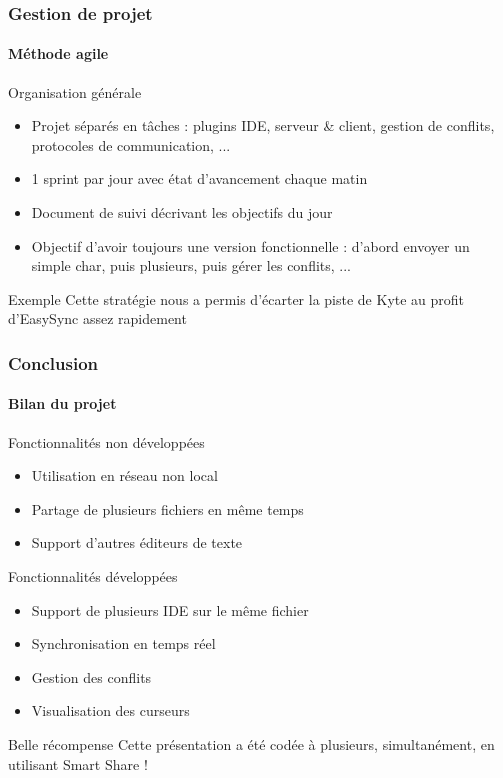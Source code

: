 \documentclass{beamer}
\begin{document}
\begin{frame}
    \frametitle{Gestion de projet}
    \framesubtitle{Méthode agile}
    \begin{block}{Organisation générale}
        \begin{itemize}
            \item Projet séparés en tâches : plugins IDE, serveur \& client, gestion de conflits, protocoles de communication, ...
            \item 1 sprint par jour avec état d'avancement chaque matin
            \item Document de suivi décrivant les objectifs du jour
            \item Objectif d'avoir toujours une version fonctionnelle : d'abord envoyer un simple char, puis plusieurs, puis gérer les conflits, ...
        \end{itemize}
    \end{block}
    \pause
    \begin{exampleblock}{Exemple}
        Cette stratégie nous a permis d'écarter la piste de Kyte au profit d'EasySync assez rapidement
    \end{exampleblock}
\end{frame}

\begin{frame}
    \frametitle{Conclusion}
    \framesubtitle{Bilan du projet}
    \begin{block}{Fonctionnalités non développées}
        \begin{itemize}
            \item Utilisation en réseau non local
            \item Partage de plusieurs fichiers en même temps
            \item Support d'autres éditeurs de texte
        \end{itemize}
    \end{block}
    \pause
    \begin{block}{Fonctionnalités développées}
        \begin{itemize}
            \item Support de plusieurs IDE sur le même fichier
            \item Synchronisation en temps réel
            \item Gestion des conflits
            \item Visualisation des curseurs
        \end{itemize}
    \end{block}
    \pause
    \begin{exampleblock}{Belle récompense}
        Cette présentation a été codée à plusieurs, simultanément, en utilisant Smart Share !
    \end{exampleblock}
\end{frame}
\end{document}
